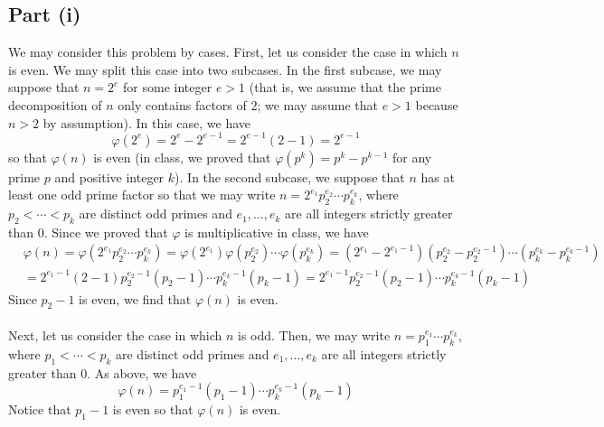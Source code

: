 \documentclass[12pt]{article}
\begin{document}
\subsection*{Part (i)}
We may consider this problem by cases. First, let us consider the case in which $n$ is even. We may split this case into two subcases. In the first subcase, we may suppose that $n = 2^{e}$ for some integer $e > 1$ (that is, we assume that the prime decomposition of $n$ only contains factors of $2$; we may assume that $e>1$ because $n > 2$ by assumption). In this case, we have
\[
\varphi(2^{e}) = 2^e - 2^{e-1} = 2^{e-1}(2 - 1) = 2^{e-1}
\] so that $\varphi(n)$ is even (in class, we proved that $\varphi(p^k) = p^k - p^{k-1}$ for any prime $p$ and positive integer $k$).
In the second subcase, we suppose that $n$ has at least one odd prime factor so that we may write $n = 2^{e_1} p_2^{e_2} \cdots p_k^{e_k}$, where $p_2 < \cdots < p_k$ are distinct odd primes and $e_1,\ldots,e_k$ are all integers strictly greater than $0$. Since we proved that $\varphi$ is multiplicative in class, we have
\begin{align*}
&\varphi(n) = \varphi(2^{e_1} p_2^{e_2} \cdots p_k^{e_k}) = \varphi(2^{e_1})\varphi(p_2^{e_2})\cdots\varphi(p_k^{e_k}) = (2^{e_1} - 2^{e_1-1})(p_2^{e_2} - p_2^{e_2 - 1})\cdots (p_k^{e_k} - p_k^{e_k - 1}) \\ &= 2^{e_1 - 1}(2-1)p_2^{e_2 - 1}(p_2 - 1)\cdots p_k^{e_k - 1}(p_k - 1) = 2^{e_1 - 1}p_2^{e_2 - 1}(p_2 - 1)\cdots p_k^{e_k - 1}(p_k - 1)
\end{align*} Since $p_2 - 1$ is even, we find that $\varphi(n)$ is even.
\\ \\
Next, let us consider the case in which $n$ is odd. Then, we may write $n = p_1^{e_1} \cdots p_k^{e_k}$, where $p_1 < \cdots < p_k$ are distinct odd primes and $e_1,\ldots,e_k$ are all integers strictly greater than $0$. As above, we have
\[
\varphi(n) = p_1^{e_1 - 1}(p_1-1)\cdots p_k^{e_k - 1}(p_k - 1)
\] Notice that $p_1 - 1$ is even so that $\varphi(n)$ is even.
\newpage
\end{document}
